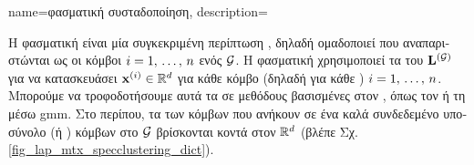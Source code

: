 {name={\foreignlanguage{greek}{φασματική συσταδοποίηση}},
	description={\foreignlanguage{greek}{Η φασματική}  
		\foreignlanguage{greek}{είναι μία συγκεκριμένη περίπτωση} , \foreignlanguage{greek}{δηλαδή 
		ομαδοποιεί}  \foreignlanguage{greek}{που αναπαριστώνται ως οι κόμβοι 
		$i=1, \,\ldots, \,n$ ενός}  $\mathcal{G}$. \foreignlanguage{greek}{Η φασματική} 
		 \foreignlanguage{greek}{χρησιμοποιεί τα}  
		\foreignlanguage{greek}{του}  ${\bf L}^{(\mathcal{G})}$ \foreignlanguage{greek}{για να κατασκευάσει} 
		 ${\bf x}^{(i)} \in \mathbb{R}^{d}$ 
		\foreignlanguage{greek}{για κάθε κόμβο (δηλαδή για κάθε} ) $i=1, \,\ldots, \,n$. 
		\foreignlanguage{greek}{Μπορούμε να τροφοδοτήσουμε αυτά τα}  \foreignlanguage{greek}{σε 
		μεθόδους}  \foreignlanguage{greek}{βασισμένες στον} ,
		\foreignlanguage{greek}{όπως τον}  \foreignlanguage{greek}{ή τη}  
		\foreignlanguage{greek}{μέσω} \gls{gmm}. \foreignlanguage{greek}{Στο περίπου, τα} 
		\foreignlanguage{greek}{των κόμβων που ανήκουν σε ένα καλά συνδεδεμένο υποσύνολο (ή} 
		) \foreignlanguage{greek}{κόμβων στο $\mathcal{G}$ βρίσκονται κοντά στον} 
		 $\mathbb{R}^{d}$ (\foreignlanguage{greek}{βλέπε Σχ.} \ref{fig_lap_mtx_specclustering_dict}). 
		\begin{figure}[H]
			\begin{center}
				\begin{minipage}{0.4\textwidth}
\end{minipage}
\end{center}
\end{figure}}}
